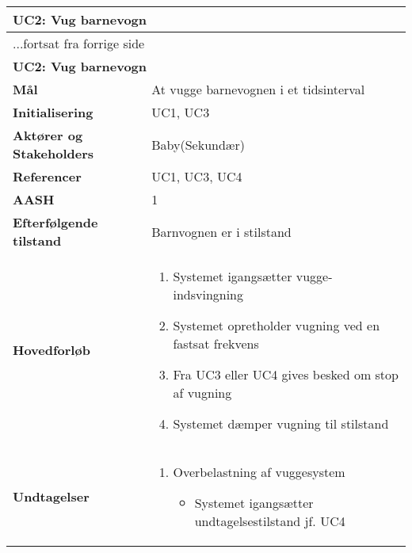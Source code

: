 \begin{center} \centering \label{kravspec:uc2}
	\begin{longtable}{|p{5cm}|p{9cm}|}  %
	\hline
		\multicolumn{2}{|l|}{\textbf{UC2: Vug barnevogn}} \\\hline %
		\endfirsthead
		
		\multicolumn{2}{l}{...fortsat fra forrige side} \\ \hline %
		\multicolumn{2}{|l|}{\textbf{UC2: Vug barnevogn}} \\\hline %
		\endhead	
		
		\textbf{Mål}							&At vugge barnevognen i et tidsinterval		\\\hline
		\textbf{Initialisering}				&UC1, UC3 \\\hline
		\textbf{Aktører og Stakeholders}		&Baby(Sekundær)		\\\hline 
		\textbf{Referencer}					&UC1, UC3, UC4		\\\hline
		\textbf{AASH}						&1		\\\hline
		\textbf{Efterfølgende tilstand}		&Barnvognen er i stilstand	\\\hline
		\textbf{Hovedforløb}					
			&\begin{enumerate}
	
				\item Systemet igangsætter vugge-indsvingning
				
				\item \label{kravspec:uc2_vugning}Systemet opretholder vugning ved en fastsat frekvens
				\newline [Und: \ref{kravspec:uc2_vugning}.a Overbelastning af vuggesystem]	
				
				\item Fra UC3 eller UC4 	gives besked om stop af vugning	
				
				\item Systemet dæmper vugning til stilstand
				
			\end{enumerate}
		\\\hline
		\textbf{Undtagelser}
			&\begin{enumerate}[label=\ref{kravspec:uc2_vugning}.a]
			\item Overbelastning af vuggesystem
					\begin{itemize}
					
					\item Systemet igangsætter undtagelsestilstand jf. UC4
					
					\end{itemize}
			\end{enumerate}
		\\\hline
	\end{longtable} 
\end{center}

